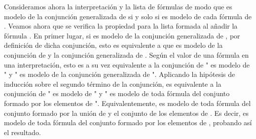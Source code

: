 \begin{isabellebody}
\begin{isamarkuptext}
\begin{demostracion}
   Consideramos ahora la interpretación \isa{{\isasymA}} y la lista de fórmulas
    de modo que \isa{{\isasymA}} es modelo de la conjunción generalizada de  
   si y solo si es modelo de cada fórmula de . Veamos ahora que se 
   verifica la propiedad para la lista  formada al añadir la 
   fórmula .
   En primer lugar, si \isa{{\isasymA}} es modelo de la conjunción generalizada de
   , por definición de dicha conjunción, esto es equivalente a
   que \isa{{\isasymA}} es modelo de la conjunción de  y la conjunción
   generalizada de . Según el valor de una fórmula en una
   interpretación, esto es a su vez equivalente a la conjunción de
   "\isa{{\isasymA}} es modelo de " y "\isa{{\isasymA}} es modelo de la conjunción 
   generalizada de ". Aplicando la hipótesis de inducción sobre el 
   segundo término de la conjunción, es equivalente a la conjunción de 
   "\isa{{\isasymA}} es  modelo de " y "\isa{{\isasymA}} es modelo de toda fórmula del 
   conjunto formado por los elementos de ". Equivalentemente, \isa{{\isasymA}} 
   es modelo de toda fórmula del conjunto formado por la unión de  
   y el conjunto de los elementos de . Es decir, \isa{{\isasymA}} es modelo de 
   toda fórmula del conjunto formado por los elementos de , 
   probando así el resultado.
  \end{demostracion}


\end{isamarkuptext}
\end{isabellebody}
